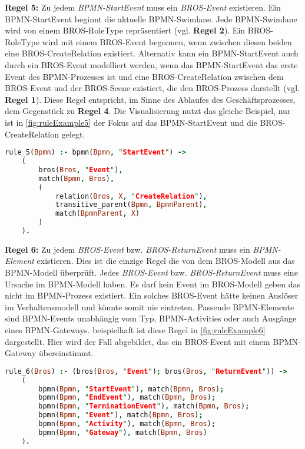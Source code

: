 \textbf{Regel 5:}
Zu jedem \emph{BPMN-StartEvent} muss ein \emph{BROS-Event} existieren.
Ein BPMN-StartEvent beginnt die aktuelle BPMN-Swimlane.
Jede BPMN-Swimlane wird von einem BROS-RoleType repräsentiert (vgl. \textbf{Regel 2}).
Ein BROS-RoleType wird mit einem BROS-Event begonnen, wenn  zwischen diesen beiden eine BROS-CreateRelation existiert.
Alternativ kann ein BPMN-StartEvent auch durch ein BROS-Event modelliert werden, wenn das BPMN-StartEvent das erste Event des BPMN-Prozesses ist und eine BROS-CreateRelation zwischen dem BROS-Event und der BROS-Scene existiert, die den BROS-Prozess darstellt (vgl. \textbf{Regel 1}).
Diese Regel entspricht, im Sinne des Ablaufes des Geschäftsprozesses, dem Gegenstück zu \textbf{Regel 4}.
Die Visualisierung nutzt das gleiche Beispiel, nur ist in \cref{fig:ruleExample5} der Fokus auf das BPMN-StartEvent und die BROS-CreateRelation gelegt.

\begin{lstlisting}[language=Prolog, caption=Formalisierung der Regel 5, label=lst:rule_5]
rule_5(Bpmn) :- bpmn(Bpmn, "StartEvent") ->
    (
        bros(Bros, "Event"),
        match(Bpmn, Bros),
        (
            relation(Bros, X, "CreateRelation"),
            transitive_parent(Bpmn, BpmnParent),
            match(BpmnParent, X)
        )
    ).
\end{lstlisting}

\textbf{Regel 6:}
Zu jedem \emph{BROS-Event} bzw. \emph{BROS-ReturnEvent} muss ein \emph{BPMN-Element} existieren.
Dies ist die einzige Regel die von dem BROS-Modell aus das BPMN-Modell überprüft.
Jedes \emph{BROS-Event} bzw. \emph{BROS-ReturnEvent} muss eine Ursache im BPMN-Modell haben.
Es darf kein Event im BROS-Modell geben das nicht im BPMN-Prozess existiert.
Ein solches BROS-Event hätte keinen Auslöser im Verhaltensmodell und könnte somit nie eintreten.
Passende BPMN-Elemente sind BPMN-Events unabhängig vom Typ, BPMN-Activities oder auch Ausgänge eines BPMN-Gateways.
beispielhaft ist diese Regel in \cref{fig:ruleExample6} dargestellt.
Hier wird der Fall abgebildet, das ein BROS-Event mit einem BPMN-Gateway übereinstimmt.

\begin{lstlisting}[language=Prolog, caption=Formalisierung der Regel 6, label=lst:rule_6]
rule_6(Bros) :- (bros(Bros, "Event"); bros(Bros, "ReturnEvent")) ->
    (
        bpmn(Bpmn, "StartEvent"), match(Bpmn, Bros);
        bpmn(Bpmn, "EndEvent"), match(Bpmn, Bros);
        bpmn(Bpmn, "TerminationEvent"), match(Bpmn, Bros);
        bpmn(Bpmn, "Event"), match(Bpmn, Bros);
        bpmn(Bpmn, "Activity"), match(Bpmn, Bros);
        bpmn(Bpmn, "Gateway"), match(Bpmn, Bros)
    ).
\end{lstlisting}

